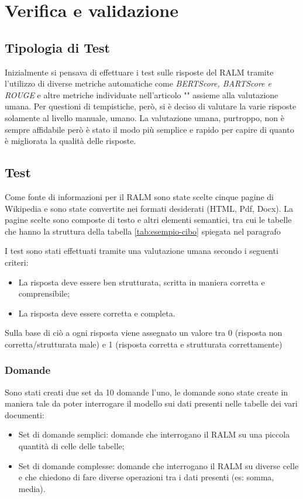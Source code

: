 \chapter{Verifica e validazione}
\label{cap:verifica-validazione}


\section{Tipologia di Test}
Inizialmente si pensava di effettuare i test sulle risposte del RALM tramite l'utilizzo di diverse metriche automatiche come \emph{BERTScore, BARTScore e ROUGE} e altre metriche individuate nell'articolo "\cite{art:metriche}" assieme alla valutazione umana.
Per questioni di tempistiche, però, si è deciso di valutare la varie risposte solamente al livello manuale, umano.
La valutazione umana, purtroppo, non è sempre affidabile però è stato il modo più semplice e rapido per capire di quanto è migliorata la qualità delle risposte.

\section{Test}
Come fonte di informazioni per il RALM sono state scelte cinque pagine di Wikipedia e sono state convertite nei formati desiderati (HTML, Pdf, Docx).
La pagine scelte sono composte di testo e altri elementi semantici, tra cui le tabelle che hanno la struttura della tabella \ref{tab:esempio-cibo} spiegata nel paragrafo 

I test sono stati effettuati tramite una valutazione umana secondo i seguenti criteri:
\begin{itemize}
    \item La risposta deve essere ben strutturata, scritta in maniera corretta e comprensibile;
    \item La risposta deve essere corretta e completa.
\end{itemize}

Sulla base di ciò a ogni risposta viene assegnato un valore tra 0 (risposta non corretta/strutturata male) e 1 (risposta corretta e strutturata correttamente)

\subsection{Domande}
Sono stati creati due set da 10 domande l'uno, le domande sono state create in maniera tale da poter interrogare il modello sui dati presenti nelle tabelle dei vari documenti:
\begin{itemize}
    \item Set di domande semplici: domande che interrogano il RALM su una piccola quantità di celle delle tabelle;
    \item Set di domande complesse: domande che interrogano il RALM su diverse celle e che chiedono di fare diverse operazioni tra i dati presenti (es: somma, media).
\end{itemize}

